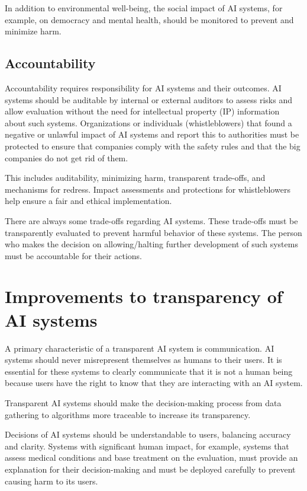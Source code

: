 In addition to environmental well-being, the social impact of AI systems, for example, on democracy and mental health, should be monitored to prevent and minimize harm.

\subsection*{Accountability}
Accountability requires responsibility for AI systems and their outcomes. AI systems should be auditable by internal or external auditors to assess risks and allow evaluation without the need for intellectual property (IP) information about such systems. Organizations or individuals (whistleblowers) that found a negative or unlawful impact of AI systems and report this to authorities must be protected to ensure that companies comply with the safety rules and that the big companies do not get rid of them.

This includes auditability, minimizing harm, transparent trade-offs, and mechanisms for redress. Impact assessments and protections for whistleblowers help ensure a fair and ethical implementation.

There are always some trade-offs regarding AI systems. These trade-offs must be transparently evaluated to prevent harmful behavior of these systems. The person who makes the decision on allowing/halting further development of such systems must be accountable for their actions.

\section{Improvements to transparency of AI systems}
A primary characteristic of a transparent AI system is communication. AI systems should never misrepresent themselves as humans to their users. It is essential for these systems to clearly communicate that it is not a human being because users have the right to know that they are interacting with an AI system.

Transparent AI systems should make the decision-making process from data gathering to algorithms more traceable to increase its transparency.

Decisions of AI systems should be understandable to users, balancing accuracy and clarity. Systems with significant human impact, for example, systems that assess medical conditions and base treatment on the evaluation, must provide an explanation for their decision-making and must be deployed carefully to prevent causing harm to its users.

